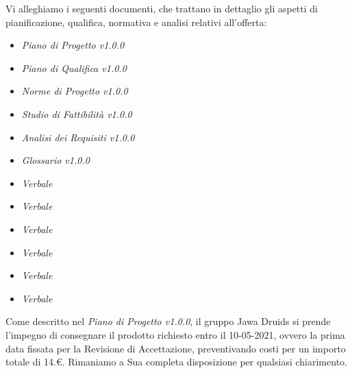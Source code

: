 \documentclass[a4paper,12pt]{report}
\begin{document}
Vi alleghiamo i seguenti documenti, che trattano in dettaglio gli aspetti di pianificazione, qualifica, normativa e analisi relativi all'offerta:
\begin{itemize}
  \item \textit{Piano di Progetto v1.0.0}
  \item \textit{Piano di Qualifica v1.0.0}
  \item \textit{Norme di Progetto v1.0.0}
  \item \textit{Studio di Fattibilità v1.0.0}
  \item \textit{Analisi dei Requisiti v1.0.0}
  \item \textit{Glossario v1.0.0}
  \item \textit{Verbale}
  \item \textit{Verbale}
  \item \textit{Verbale}
  \item \textit{Verbale}
  \item \textit{Verbale}
  \item \textit{Verbale}
\end{itemize}

Come descritto nel \textit{Piano di Progetto v1.0.0}, il gruppo Jawa Druids si prende l’impegno di consegnare il prodotto richiesto entro il 10-05-2021, ovvero la prima data fissata per
la Revisione di Accettazione, preventivando costi per un importo totale di 14.\euro.
Rimaniamo a Sua completa disposizione per qualsiasi chiarimento.
\end{document}
